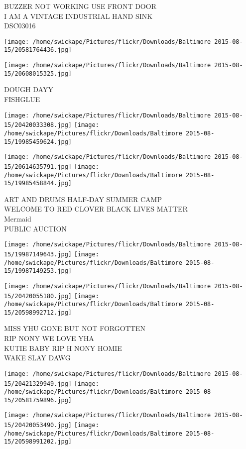 \documentclass[10pt,letterpaper]{article}
\begin{document}
BUZZER NOT WORKING USE FRONT DOOR\\
I AM A VINTAGE INDUSTRIAL HAND SINK\\
DSC03016
\pagebreak

\texttt{[image: /home/swickape/Pictures/flickr/Downloads/Baltimore 2015-08-15/20581764436.jpg]}

\vspace{0.25in}
\texttt{[image: /home/swickape/Pictures/flickr/Downloads/Baltimore 2015-08-15/20608015325.jpg]}

DOUGH DAYY\\
FISHGLUE
\pagebreak

\texttt{[image: /home/swickape/Pictures/flickr/Downloads/Baltimore 2015-08-15/20420033308.jpg]}
\texttt{[image: /home/swickape/Pictures/flickr/Downloads/Baltimore 2015-08-15/19985459624.jpg]}

\texttt{[image: /home/swickape/Pictures/flickr/Downloads/Baltimore 2015-08-15/20614635791.jpg]}
\texttt{[image: /home/swickape/Pictures/flickr/Downloads/Baltimore 2015-08-15/19985458844.jpg]}

ART AND DRUMS HALF{-}DAY SUMMER CAMP\\
WELCOME TO RED CLOVER BLACK LIVES MATTER\\
Mermaid\\
PUBLIC AUCTION
\pagebreak

\texttt{[image: /home/swickape/Pictures/flickr/Downloads/Baltimore 2015-08-15/19987149643.jpg]}
\texttt{[image: /home/swickape/Pictures/flickr/Downloads/Baltimore 2015-08-15/19987149253.jpg]}

\texttt{[image: /home/swickape/Pictures/flickr/Downloads/Baltimore 2015-08-15/20420055180.jpg]}
\texttt{[image: /home/swickape/Pictures/flickr/Downloads/Baltimore 2015-08-15/20598992712.jpg]}

MISS YHU GONE BUT NOT FORGOTTEN\\
RIP NONY WE LOVE YHA\\
KUTIE BABY RIP H NONY HOMIE\\
WAKE SLAY DAWG
\pagebreak

\texttt{[image: /home/swickape/Pictures/flickr/Downloads/Baltimore 2015-08-15/20421329949.jpg]}
\texttt{[image: /home/swickape/Pictures/flickr/Downloads/Baltimore 2015-08-15/20581759896.jpg]}

\texttt{[image: /home/swickape/Pictures/flickr/Downloads/Baltimore 2015-08-15/20420053490.jpg]}
\texttt{[image: /home/swickape/Pictures/flickr/Downloads/Baltimore 2015-08-15/20598991202.jpg]}
\end{document}
